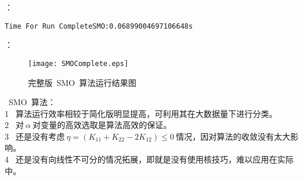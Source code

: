 ：
\begin{lstlisting}
Time For Run CompleteSMO:0.06899004697106648s
\end{lstlisting}

：
\begin{figure}[!htb]
  \centering
  \texttt{[image: SMOComplete.eps]}
  \caption{完整版~SMO~算法运行结果图}
\end{figure}

~SMO~算法：\\
\textcircled{\footnotesize{1}}  ~算法运行效率相较于简化版明显提高，可利用其在大数据量下进行分类。        \\
\textcircled{\footnotesize{2}}  ~对$~\alpha~$对变量的高效选取是算法高效的保证。       \\
\textcircled{\footnotesize{3}}  ~还是没有考虑$~\eta=(K_{11}+K_{22}-2K_{12})\leq0~$情况，因对算法的收敛没有太大影响。       \\
\textcircled{\footnotesize{4}}  ~还是没有向线性不可分的情况拓展，即就是没有使用核技巧，难以应用在实际中。       \\




